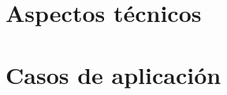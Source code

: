 \documentclass[12pt]{beamer}
\begin{document}
\begin{comment}
\section{Descripción del lado del usuario}
  \begin{frame}
    \begin{itemize}
    \item Está ́ basado en TLA (Temporal Logic of Actions), una variante simple de LTL
    \item Posee un IDE \textbf{Toolbox}, que integra las siguientes herramientas:	
	\subitem \textbf{PlusCal}: Lenguaje algoritmico simple que se compila a TLA+
	\subitem \textbf{Modelo Standard}: Un sistema se describe como un conjunto de comportamientos
	\subitem \textbf{TLC}: \textit{Model Checker}
	\subitem \textbf{TLA+ Proof System}: Desarrollo y verificación mecánica de demostraciones

    \end{itemize}
  \end{frame}
  
  \begin{frame} 
      \frametitle{TLA+ Proof System}
      Plataforma Desarrollo y verificación mecánica de demostraciones
      Soporta desarrollo incremental y verifica la estructura jerárquica de la demostracion.
      Maneja casi toda la parte no temporal de TLA+ y el razonamiento temporal necesario para probar propiedades de seguridad (\textit{safety}) estándar (como invariantes y simulación de transiciones), pero no para propiedades de vitalidad (\textit{liveness})

  \end{frame}
  
\end{comment}
\section{Aspectos técnicos}

\begin{frame}
\end{frame}


\section{Casos de aplicación}

\begin{frame}
\end{frame}
\end{document}
